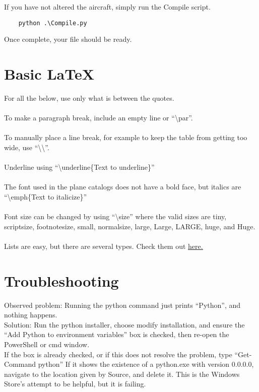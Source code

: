\documentclass{article}
\begin{document}
If you have not altered the aircraft, simply run the Compile script.
\begin{verbatim}
    python .\Compile.py
\end{verbatim}
Once complete, your file should be ready.
\section{Basic \LaTeX}
For all the below, use only what is between the quotes.
\\\\
\setlength{\parindent}{0em}
To make a paragraph break, include an empty line or ``\textbackslash par''.
\\\\
To manually place a line break, for example to keep the table from getting too wide, use ``\textbackslash\textbackslash''.
\\\\
Underline using ``\textbackslash underline\{Text to underline\}''
\\\\
The font used in the plane catalogs does not have a bold face, but italics are ``\textbackslash emph\{Text to italicize\}''
\\\\
Font size can be changed by using ``\textbackslash size'' where the valid sizes are tiny, scriptsize, footnotesize, small, normalsize, large, Large, LARGE, huge, and Huge.
\\\\
Lists are easy, but there are several types.  Check them out \href{https://www.overleaf.com/learn/latex/Lists}{\color{blue}\underline{here.}}

\section{Troubleshooting}

Observed problem: Running the python command just prints ``Python'', and nothing happens.
\\
Solution: Run the python installer, choose modify installation, and ensure the ``Add Python to environment variables'' box is checked, then re-open the PowerShell or cmd window.
\\
If the box is already checked, or if this does not resolve the problem, type ``Get-Command python''  If it shows the existence of a python.exe with version 0.0.0.0, navigate to the location given by Source, and delete it.  This is the Windows Store's attempt to be helpful, but it is failing.
\end{document}
